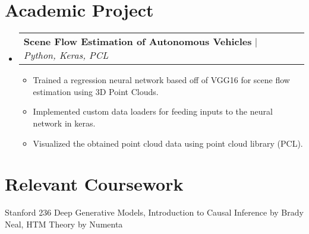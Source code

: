 \documentclass[letterpaper,10pt]{article}
\makeatletter
\newcommand{\resumeItem}[1]{
  \item\small{
    {#1 \vspace{-2pt}}
  }
}
\newcommand{\resumeProjectHeading}[2]{
    \item
    \begin{tabular*}{0.97\textwidth}{l@{\extracolsep{\fill}}r}
      \small#1 & #2 \\
    \end{tabular*}\vspace{-7pt}
}
\newcommand{\resumeSubHeadingListStart}{\begin{itemize}[leftmargin=0.15in, label={}]}
\newcommand{\resumeSubHeadingListEnd}{\end{itemize}}
\newcommand{\resumeItemListStart}{\begin{itemize}}
\newcommand{\resumeItemListEnd}{\end{itemize}\vspace{-5pt}}
\makeatother
\begin{document}
\section{Academic Project}
    \resumeSubHeadingListStart
      \resumeProjectHeading
          {\textbf{Scene Flow Estimation of Autonomous Vehicles} $|$ \emph{Python, Keras, PCL}}{}
          \resumeItemListStart
            \resumeItem{Trained a regression neural network based off of VGG16 for scene flow estimation using 3D Point Clouds.}
            \resumeItem{Implemented custom data loaders for feeding inputs to the neural network in keras.}
            \resumeItem{Visualized the obtained point cloud data using point cloud library (PCL).}
          \resumeItemListEnd
    \resumeSubHeadingListEnd

\section{Relevant Coursework}
\begin{itemize}[leftmargin=0.15in, label={}]
  \small{\item{
   Stanford 236 Deep Generative Models, Introduction to Causal Inference by Brady Neal, HTM Theory by Numenta
  }}
\end{itemize}
  

%
\end{document}
